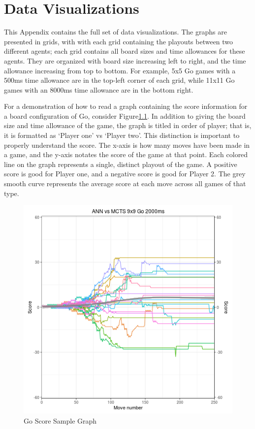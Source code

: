 %
%

\chapter{Data Visualizations}\label{appa:data}
This Appendix contains the full set of data visualizations.  The graphs are presented in grids, with with each grid containing the playouts between two different agents; each grid contains all board sizes and time allowances for these agents.  They are organized with board size increasing left to right, and the time allowance increasing from top to bottom.  For example, 5x5 Go games with a 500ms time allowance are in the top-left corner of each grid, while 11x11 Go games with an 8000ms time allowance are in the bottom right.

For a demonstration of how to read a graph containing the score information for a board configuration of Go, consider Figure\ref{fig:apex}.  In addition to giving the board size and time allowance of the game, the graph is titled in order of player; that is, it is formatted as `Player one' vs `Player two'.  This distinction is important to properly understand the score.  The x-axis is how many moves have been made in a game, and the y-axis notates the score of the game at that point.  Each colored line on the graph represents a single, distinct playout of the game.  A positive score is good for Player one, and a negative score is good for Player 2.  The grey smooth curve represents the average score at each move across all games of that type.

\begin{figure}[h]
  \centering
  \includegraphics[scale=0.6]{images/Visualizations/ANNvsMCTS/2000ms9x9.png}
  \caption{Go Score Sample Graph}
  \label{fig:apex}
\end{figure}

